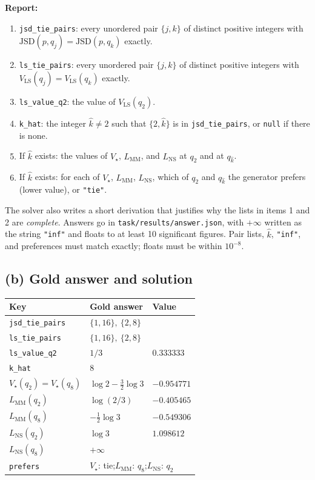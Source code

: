\medskip\noindent\textbf{Report:}
\begin{enumerate}
  \item \texttt{jsd\_tie\_pairs}: every unordered pair \(\{j,k\}\) of distinct
        positive integers with \(\mathrm{JSD}(p,q_j)=\mathrm{JSD}(p,q_k)\) exactly.
  \item \texttt{ls\_tie\_pairs}: every unordered pair \(\{j,k\}\) of distinct
        positive integers with \(V_{\mathrm{LS}}(q_j)=V_{\mathrm{LS}}(q_k)\) exactly.
  \item \texttt{ls\_value\_q2}: the value of \(V_{\mathrm{LS}}(q_2)\).
  \item \texttt{k\_hat}: the integer \(\hat k\neq2\) such that \(\{2,\hat k\}\)
        is in \texttt{jsd\_tie\_pairs}, or \texttt{null} if there is none.
  \item If \(\hat k\) exists: the values of \(V_\star\), \(L_{\mathrm{MM}}\),
        and \(L_{\mathrm{NS}}\) at \(q_2\) and at \(q_{\hat k}\).
  \item If \(\hat k\) exists: for each of \(V_\star\), \(L_{\mathrm{MM}}\),
        \(L_{\mathrm{NS}}\), which of \(q_2\) and \(q_{\hat k}\) the generator
        prefers (lower value), or \texttt{"tie"}.
\end{enumerate}
The solver also writes a short derivation that justifies why the lists in
items 1 and 2 are \emph{complete}. Answers go in
\texttt{task/results/answer.json}, with \(+\infty\) written as the string
\texttt{"inf"} and floats to at least 10 significant figures. Pair lists,
\(\hat k\), \texttt{"inf"}, and preferences must match exactly; floats must be
within \(10^{-8}\).

\subsection{(b) Gold answer and solution}

\begin{center}
\begin{tabular}{@{}lll@{}}
\toprule
Key & Gold answer & Value\\
\midrule
\texttt{jsd\_tie\_pairs} & \(\{1,16\},\ \{2,8\}\) & \\
\texttt{ls\_tie\_pairs} & \(\{1,16\},\ \{2,8\}\) & \\
\texttt{ls\_value\_q2} & \(1/3\) & \(0.333333\)\\
\texttt{k\_hat} & \(8\) & \\
\(V_\star(q_2)=V_\star(q_8)\) & \(\log2-\tfrac32\log3\) & \(-0.954771\)\\
\(L_{\mathrm{MM}}(q_2)\) & \(\log(2/3)\) & \(-0.405465\)\\
\(L_{\mathrm{MM}}(q_8)\) & \(-\tfrac12\log3\) & \(-0.549306\)\\
\(L_{\mathrm{NS}}(q_2)\) & \(\log3\) & \(1.098612\)\\
\(L_{\mathrm{NS}}(q_8)\) & \(+\infty\) & \\
\texttt{prefers} & \multicolumn{2}{l}{\(V_\star\): tie;\quad \(L_{\mathrm{MM}}\): \(q_8\);\quad \(L_{\mathrm{NS}}\): \(q_2\)}\\
\bottomrule
\end{tabular}
\end{center}

